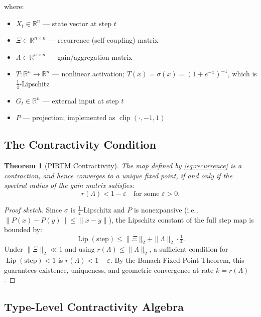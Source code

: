 \documentclass[11pt,letterpaper]{article}
\newtheorem{theorem}{Theorem}[section]
\theoremstyle{remark}
\begin{document}
\noindent where:
\begin{itemize}
  \item $X_t \in \mathbb{R}^n$ --- state vector at step $t$
  \item $\Xi \in \mathbb{R}^{n \times n}$ --- recurrence (self-coupling) matrix
  \item $\Lambda \in \mathbb{R}^{n \times n}$ --- gain/aggregation matrix
  \item $T : \mathbb{R}^n \to \mathbb{R}^n$ --- nonlinear activation;
    $T(x) = \sigma(x) = (1+e^{-x})^{-1}$, which is $\tfrac{1}{4}$-Lipschitz
  \item $G_t \in \mathbb{R}^n$ --- external input at step $t$
  \item $P$ --- projection; implemented as $\operatorname{clip}(\cdot,-1,1)$
\end{itemize}

\subsection{The Contractivity Condition}

\begin{theorem}[PIRTM Contractivity]
\label{thm:contractivity}
The map defined by \eqref{eq:recurrence} is a contraction, and hence
converges to a unique fixed point, if and only if the spectral radius
of the gain matrix satisfies:
\begin{equation}
  r(\Lambda) < 1 - \varepsilon \quad \text{for some } \varepsilon > 0.
  \label{eq:contractivity}
\end{equation}
\end{theorem}

\begin{proof}[Proof sketch]
Since $\sigma$ is $\tfrac{1}{4}$-Lipschitz and $P$ is nonexpansive
(i.e., $\|P(x)-P(y)\| \leq \|x-y\|$), the Lipschitz constant of the full
step map is bounded by:
\[
  \operatorname{Lip}(\mathrm{step}) \leq \|\Xi\|_2 + \|\Lambda\|_2 \cdot \tfrac{1}{4}.
\]
Under $\|\Xi\|_2 \ll 1$ and using $r(\Lambda) \leq \|\Lambda\|_2$, a
sufficient condition for $\operatorname{Lip}(\mathrm{step}) < 1$ is
$r(\Lambda) < 1 - \varepsilon$. By the Banach Fixed-Point Theorem,
this guarantees existence, uniqueness, and geometric convergence
at rate $k = r(\Lambda)$.
\end{proof}

\subsection{Type-Level Contractivity Algebra}
\end{document}
